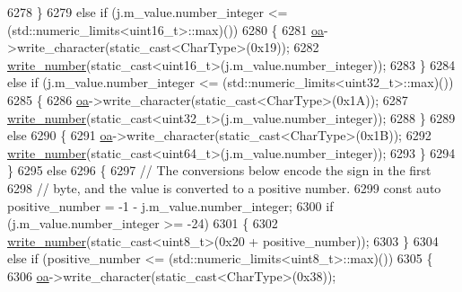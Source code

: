 \begin{DoxyCode}
6278                     \}
6279                     \textcolor{keywordflow}{else} \textcolor{keywordflow}{if} (j.m\_value.number\_integer <= (std::numeric\_limits<uint16\_t>::max)())
6280                     \{
6281                         \hyperlink{classnlohmann_1_1detail_1_1binary__writer_a6f15b782a7900f50ef37d123008e601b}{oa}->write\_character(static\_cast<CharType>(0x19));
6282                         \hyperlink{classnlohmann_1_1detail_1_1binary__writer_a62cfd50a511371e718f37ad7bb29ae9d}{write\_number}(static\_cast<uint16\_t>(j.m\_value.number\_integer));
6283                     \}
6284                     \textcolor{keywordflow}{else} \textcolor{keywordflow}{if} (j.m\_value.number\_integer <= (std::numeric\_limits<uint32\_t>::max)())
6285                     \{
6286                         \hyperlink{classnlohmann_1_1detail_1_1binary__writer_a6f15b782a7900f50ef37d123008e601b}{oa}->write\_character(static\_cast<CharType>(0x1A));
6287                         \hyperlink{classnlohmann_1_1detail_1_1binary__writer_a62cfd50a511371e718f37ad7bb29ae9d}{write\_number}(static\_cast<uint32\_t>(j.m\_value.number\_integer));
6288                     \}
6289                     \textcolor{keywordflow}{else}
6290                     \{
6291                         \hyperlink{classnlohmann_1_1detail_1_1binary__writer_a6f15b782a7900f50ef37d123008e601b}{oa}->write\_character(static\_cast<CharType>(0x1B));
6292                         \hyperlink{classnlohmann_1_1detail_1_1binary__writer_a62cfd50a511371e718f37ad7bb29ae9d}{write\_number}(static\_cast<uint64\_t>(j.m\_value.number\_integer));
6293                     \}
6294                 \}
6295                 \textcolor{keywordflow}{else}
6296                 \{
6297                     \textcolor{comment}{// The conversions below encode the sign in the first}
6298                     \textcolor{comment}{// byte, and the value is converted to a positive number.}
6299                     \textcolor{keyword}{const} \textcolor{keyword}{auto} positive\_number = -1 - j.m\_value.number\_integer;
6300                     \textcolor{keywordflow}{if} (j.m\_value.number\_integer >= -24)
6301                     \{
6302                         \hyperlink{classnlohmann_1_1detail_1_1binary__writer_a62cfd50a511371e718f37ad7bb29ae9d}{write\_number}(static\_cast<uint8\_t>(0x20 + positive\_number));
6303                     \}
6304                     \textcolor{keywordflow}{else} \textcolor{keywordflow}{if} (positive\_number <= (std::numeric\_limits<uint8\_t>::max)())
6305                     \{
6306                         \hyperlink{classnlohmann_1_1detail_1_1binary__writer_a6f15b782a7900f50ef37d123008e601b}{oa}->write\_character(static\_cast<CharType>(0x38));

\end{DoxyCode}
